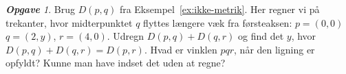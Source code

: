 \documentclass[a4paper, 12pt]{article}
\theoremstyle{remark}
\newtheorem{Opgave}{\textbf{Opgave}}
\begin{document}
\begin{Opgave} Brug $D(p,q)$ fra Eksempel~\ref{ex:ikke-metrik}. Her regner vi på trekanter, hvor midterpunktet $q$ flyttes længere væk fra førsteaksen: $p=(0,0)$ $q=(2,y)$, $r=(4,0)$. Udregn $D(p,q)+D(q,r)$ og find det $y$, hvor $D(p,q)+D(q,r)=D(p,r)$. Hvad er vinklen $pqr$, når den ligning er opfyldt? Kunne man have indset det uden at regne?
\end{Opgave}
\end{document}
